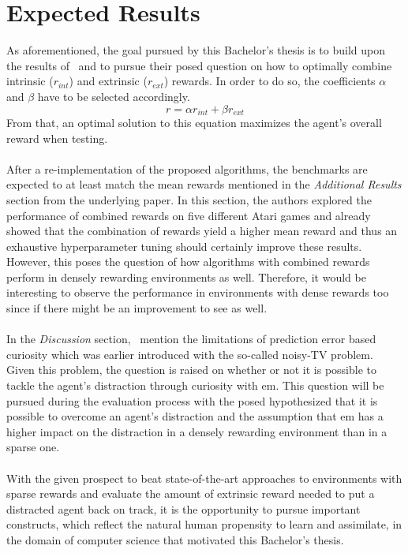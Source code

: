 \documentclass[draft,final]{vutinfth} %
\begin{document}
    \section{Expected Results}\label{sec:expected-results}
    As aforementioned, the goal pursued by this Bachelor's thesis is to build upon the results of~\citeauthor{burda_large-scale_2018-1} and to pursue their posed question on how to optimally combine intrinsic ($r_{int}$) and extrinsic ($r_{ext}$) rewards.
    In order to do so, the coefficients $\alpha$ and $\beta$ have to be selected accordingly.
    \[r=\alpha r_{int} + \beta r_{ext}\]
    From that, an optimal solution to this equation maximizes the agent's overall reward when testing.
    \\\\
    After a re-implementation of the proposed algorithms, the benchmarks are expected to at least match the mean rewards mentioned in the \textit{Additional Results} section from the underlying paper.
    In this section, the authors explored the performance of combined rewards on five different Atari games and already showed that the combination of rewards yield a higher mean reward and thus an exhaustive hyperparameter tuning should certainly improve these results.
    However, this poses the question of how algorithms with combined rewards perform in densely rewarding environments as well.
    Therefore, it would be interesting to observe the performance in environments with dense rewards too since if there might be an improvement to see as well.
    \\\\
    In the \textit{Discussion} section,~\citeauthor{burda_large-scale_2018-1} mention the limitations of prediction error based curiosity which was earlier introduced with the so-called noisy-TV problem.
    Given this problem, the question is raised on whether or not it is possible to tackle the agent's distraction through curiosity with \gls{em}.
    This question will be pursued during the evaluation process with the posed hypothesized that it is possible to overcome an agent's distraction and the assumption that \gls{em} has a higher impact on the distraction in a densely rewarding environment than in a sparse one.
    \\\\
    With the given prospect to beat state-of-the-art approaches to environments with sparse rewards and evaluate the amount of extrinsic reward needed to put a distracted agent back on track, it is the opportunity to pursue important constructs, which reflect the natural human propensity to learn and assimilate, in the domain of computer science that motivated this Bachelor's thesis.
\end{document}
